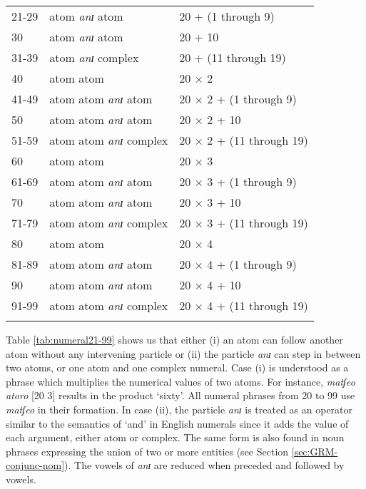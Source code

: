 \begin{exe}
\begin{exe}
\begin{exe}
{\begin{exe}
\begin{exe}
\begin{exe}
\begin{exe}
\begin{exe}
\begin{exe}
\begin{exe}
\begin{xlist}
\begin{exe}
\begin{exe}
\begin{exe}
\begin{table}[!h]
\begin{tabular}{lll}
21-29& atom {\it anɪ} atom &  20  + (1 through 9) \\ 
30  &  atom  {\it anɪ} atom  & 20  + 10\\   
31-39&  atom {\it anɪ} complex  & 20  + (11 through 19)     \\      
40 &  atom  atom & 20 $\times$    2 \\
41-49&   atom  atom  {\it anɪ} atom &  20 $\times$  2  + (1 through 9) \\     
50 &  atom  atom  {\it anɪ} atom & 20 $\times$ 2 + 10 \\ 
51-59 & atom  atom  {\it anɪ} complex &20 $\times$ 2  + (11 through 19)\\ 
60 & atom  atom & 20 $\times$ 3\\ 
61-69 & atom  atom {\it anɪ} atom  &20 $\times$ 3 + (1 through 9) \\
70 &  atom  atom  {\it anɪ} atom& 20 $\times$ 3 + 10\\ 
71-79 &atom  atom  {\it anɪ} complex  &20 $\times$ 3   + (11 through 19)\\ 
80 & atom  atom  & 20 $\times$ 4\\ 
81-89 & atom  atom {\it anɪ} atom&20 $\times$ 4 + (1 through 9)\\ 
90 &  atom  atom  {\it anɪ} atom&20 $\times$ 4 + 10 \\ 
91-99 & atom  atom  {\it anɪ} complex& 20 $\times$ 4   + (11 through 19)\\      
\lspbottomrule
\end{tabular}
\end{table}



Table \ref{tab:numeral21-99} shows us that either (i) an atom can follow another
atom without any intervening particle  or (ii) the particle {\it anɪ} can step 
in
between two atoms, or one atom and one complex numeral. Case (i) is understood
as a phrase which multiplies the numerical values of  two atoms. For
instance, 
{\it matʃeo atoro} [20
3] results in the product `sixty'.  All numeral phrases from 20 to 99 use {\it 
matʃeo} in their formation. 
In case (ii),  the particle {\it anɪ} is treated as an operator similar to the
semantics of  `and' in English numerals since it adds the value of each
argument, either atom or complex.  The same form is also found in noun phrases
expressing the union of two or more entities (see Section
\ref{sec:GRM-conjunc-nom}).
The vowels of {\it anɪ} are reduced when preceded and followed by
vowels.


\end{exe}
\end{exe}
\end{exe}
\end{xlist}
\end{exe}
\end{exe}
\end{exe}
\end{exe}
\end{exe}
\end{exe}
\end{exe}}
\end{exe}
\end{exe}
\end{exe}
